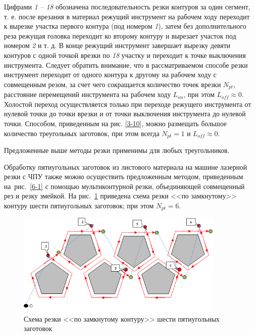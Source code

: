 \documentclass[11pt,twoside,openany]{report}
\begin{document}
Цифрами {\it 1 -- 18} обозначена последовательность
резки контуров за один сегмент,
т. е. после врезания в материал режущий инструмент
на рабочем ходу переходит к вырезке участка
первого контура
(под номером {\it 1}),
затем без дополнительного реза режущая
головка переходит ко второму контуру и
вырезает участок под номером {\it 2} и т. д.
В конце режущий инструмент завершает
вырезку девяти контуров с одной точкой врезки
по {\it 18} участку и переходит к точке выключения инструмента.
Следует обратить внимание, что в рассматриваемом способе
резки инструмент переходит от одного контура к
другому на рабочем ходу с совмещенным резом,
за счет чего сокращается количество точек врезки $N_{pt}$,
расстояние перемещений инструмента на рабочем ходу  $L_{on}$,
при этом
$L_{off} \approx 0$.
Холостой переход осуществляется
только при переходе режущего инструмента
от нулевой точки до точки врезки и от
точки выключения инструмента до нулевой точки.
Способом, приведенным на рис. \ref{3-10},
можно размещать большое количество
треугольных заготовок, при этом всегда $N_{pt}=1$
и $L_{off} \approx 0$.

Предложенные выше методы резки  применимы для любых треугольников.

Обработку пятиугольных заготовок из листового материала
на машине лазерной резки с ЧПУ также можно осуществить
предложенным методом, приведенным
на~рис.~\ref{6-1}
с помощью мультиконтурной резки,
объединяющей совмещенный рез и резку змейкой.
На рис.~\ref{5-6}
приведена схема резки <<по замкнутому>> контуру
шести пятиугольных заготовок;
при этом $N_{pt}=6$.

\begin{figure}[h]
  \begin{center}
  \includegraphics[width=0.9\textwidth]{5-6.png}
  \caption{Схема резки <<по замкнутому контуру>> шести пятиугольных заготовок}
  \label{5-6}
  \end{center}
\end{figure}
\end{document}
